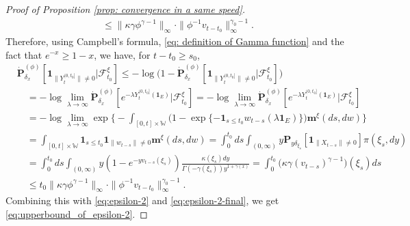 \documentclass[12pt, a4paper]{amsart}
\theoremstyle{definition}
\numberwithin{equation}{section}
\begin{document}
\begin{proof}[Proof of Proposition \ref{prop: convergence in a same speed}]
\begin{equation}
\begin{split}
	\leq \|\kappa\gamma\phi^{\gamma - 1}\|_\infty \cdot \|\phi^{-1}v_{t-t_0}\|^{\gamma_0-1}_\infty.
\end{split}\end{equation}
	Therefore, using Campbell's formula, \eqref{eq: definition of Gamma function} and the fact that $e^{-x} \geq 1-x$, we have,  for $t-t_0 \geq s_0$,
\begin{equation}\begin{split}
	&\dot{\mathbf P}_{\delta_x}^{(\phi)}[\mathbf 1_{\| Y_t^{(0,t_0]}\|\neq 0}|\mathscr F^\xi_{t_0}]
	\leq - \log \big( 1- \dot{\mathbf P}_{\delta_x}^{(\phi)}[\mathbf 1_{ \| Y_t^{(0,t_0]}\|\neq 0}|\mathscr F^\xi_{t_0}]\big)
	\\&\quad =  - \log \lim_{\lambda \to \infty}\dot{\mathbf P}_{\delta_x}^{(\phi)}[e^{- \lambda Y_t^{(0,t_0]}(\mathbf 1_E) }|\mathscr F^\xi_{t_0}]
	=  - \log \lim_{\lambda \to \infty}\dot{\mathbf P}_{\delta_x}^{(\phi)}[e^{- \lambda Y_t^{(0,t_0]}(\mathbf 1_E) }|\mathscr F^\xi_{t_0}]
	\\&\quad = -\log \lim_{\lambda \to \infty} \exp\Big\{- \int_{[0,t]\times \mathbb W} \big( 1-\exp\{- \mathbf 1_{s\leq t_0} w_{t-s}(\lambda \mathbf 1_E)\}  \big) \mathbf m^\xi(ds,dw)\Big\}
	\\&\quad = \int_{[0,t]\times \mathbb W}\mathbf 1_{s\leq t_0} \mathbf 1_{ \|w_{t-s}\| \neq 0} \mathbf m^\xi(ds,dw)
	= \int_0^{t_0} ds \int_{(0,\infty)} y\mathbf P_{y\delta_{\xi_s}}[\mathbf 1_{ \|X_{t-s}\| \neq 0}]\pi(\xi_s,dy)
	\\&\quad= \int_0^{t_0} ds \int_{(0,\infty)} y (1-e^{-yv_{t-s}(\xi_s)})  \frac{\kappa(\xi_s)dy}{\Gamma(-\gamma(\xi_s)) y^{1+\gamma(x)}}
	= \int_0^{t_0} \big( \kappa \gamma (v_{t-s})^{\gamma - 1} \big) (\xi_s)ds
	\\&\quad \leq  t_0\|\kappa \gamma \phi^{\gamma - 1}\|_\infty \cdot \|\phi^{-1}v_{t-t_0}\|^{\gamma_0-1}_\infty.
\end{split}\end{equation}
Combining this with \eqref{eq:epsilon-2} and \eqref{eq:epsilon-2-final}, we get \eqref{eq:upperbound_of_epsilon-2}.


\end{proof}
\end{document}
